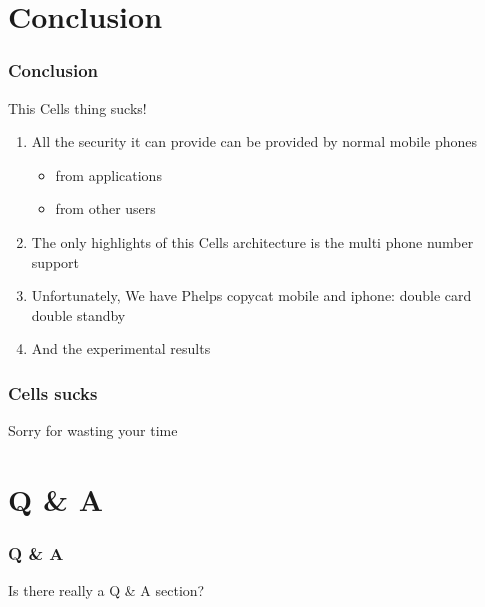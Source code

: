 \documentclass[utf8]{beamer}
\begin{document}
\section{Conclusion}
\begin{frame}
\frametitle{Conclusion}
This Cells thing sucks!
\begin{enumerate}
\item<+-> All the security it can provide can be provided by normal mobile phones
    \begin{itemize}
    \item<+-> from applications
    \item<+-> from other users
    \end{itemize}
\item<+-> The only highlights of this Cells architecture is the multi phone number support
\item<+-> Unfortunately, We have Phelps copycat mobile and iphone: double card double standby
\item<+-> And the experimental results
\end{enumerate}
\end{frame}

\begin{frame}
\frametitle{Cells sucks}
\begin{center}
Sorry for wasting your time
\end{center}
\end{frame}

\section{Q \& A}
\begin{frame}
\frametitle{Q \& A}
\begin{center}
Is there really a Q \& A section?
\end{center}
\end{frame}
\end{document}
